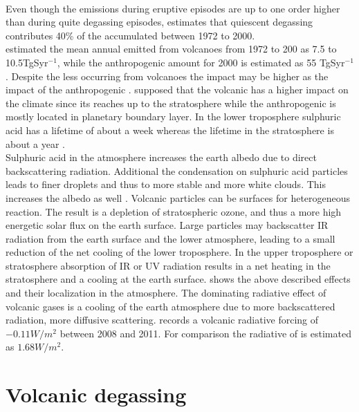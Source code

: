 \documentclass  [
  paper    = a4,
  BCOR     = 10mm,
  twoside,
  fontsize = 12pt,
  fleqn,
  toc      = bibnumbered,
  toc      = listofnumbered,
  numbers  = noendperiod,
  headings = normal,
  listof   = leveldown,
  version  = 3.03
]                                       {scrreprt}
\begin{document}
\\
Even though the  emissions during eruptive episodes are up to one order higher than during quite degassing episodes, \citet{halmer2002annual} estimates that quiescent degassing contributes 40\% of the accumulated  between 1972 to 2000.\\
\citet{halmer2002annual} estimated the mean annual   emitted from volcanoes from 1972 to 200 as 7.5 to 10.5TgSyr$^{-1}$, while the anthropogenic   amount for 2000 is estimated as 55 TgSyr$^{-1}$ \citep{IPCC}. Despite the less   occurring from volcanoes the impact may be higher as the impact of the anthropogenic . \citet{graf1997volcanic} supposed that the volcanic   has a higher impact on the climate since its reaches up to the stratosphere while the anthropogenic   is mostly located in planetary boundary layer. In the lower troposphere sulphuric acid has a lifetime of about a week whereas the lifetime in the stratosphere is about a year \citep{IPCC}.\\
Sulphuric acid in the atmosphere increases the earth albedo due to direct backscattering radiation. Additional the condensation on sulphuric acid particles leads to finer droplets and thus to more stable and more white clouds. This increases the albedo as well \citep{twomey1974pollution}.
Volcanic particles can be surfaces for heterogeneous reaction. The result is a depletion of stratospheric ozone, and thus a more high energetic solar flux on the earth surface.
Large particles may backscatter IR radiation from the earth surface and the lower atmosphere, leading to a small reduction of the net cooling of the lower troposphere.
In the upper troposphere or stratosphere absorption of IR or UV radiation results in a net heating in the stratosphere and a cooling at the earth surface.
 shows the above described effects and their localization in the atmosphere.
The dominating radiative effect of volcanic gases is a cooling of the earth atmosphere due to  more backscattered radiation, more diffusive scattering\citep{robock2000volcanic}.
\citet{IPCC} records a volcanic radiative forcing of $-0.11W/m^{2}$ between 2008 and 2011. For comparison the radiative of   is estimated as  $1.68W/m^{2}$.





\section{Volcanic degassing}
\end{document}
